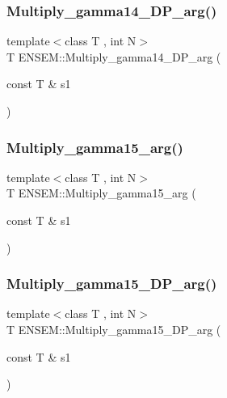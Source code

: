 \mbox{\label{namespaceENSEM_afea32aec2f20f6bef65800f628aa2ac6}} 
\subsubsection{\texorpdfstring{Multiply\_gamma14\_DP\_arg()}{Multiply\_gamma14\_DP\_arg()}}
{\footnotesize\ttfamily template$<$class T , int N$>$ \\
T E\+N\+S\+E\+M\+::\+Multiply\+\_\+gamma14\+\_\+\+D\+P\+\_\+arg (\begin{DoxyParamCaption}\item[{const T \&}]{s1 }\end{DoxyParamCaption})\hspace{0.3cm}{\ttfamily [inline]}}

\mbox{\label{namespaceENSEM_ad162069adba3b41fb86d8ff508380d57}} 
\subsubsection{\texorpdfstring{Multiply\_gamma15\_arg()}{Multiply\_gamma15\_arg()}}
{\footnotesize\ttfamily template$<$class T , int N$>$ \\
T E\+N\+S\+E\+M\+::\+Multiply\+\_\+gamma15\+\_\+arg (\begin{DoxyParamCaption}\item[{const T \&}]{s1 }\end{DoxyParamCaption})\hspace{0.3cm}{\ttfamily [inline]}}

\mbox{\label{namespaceENSEM_a2604fc2158319ad3521cb11baf9f4827}} 
\subsubsection{\texorpdfstring{Multiply\_gamma15\_DP\_arg()}{Multiply\_gamma15\_DP\_arg()}}
{\footnotesize\ttfamily template$<$class T , int N$>$ \\
T E\+N\+S\+E\+M\+::\+Multiply\+\_\+gamma15\+\_\+\+D\+P\+\_\+arg (\begin{DoxyParamCaption}\item[{const T \&}]{s1 }\end{DoxyParamCaption})\hspace{0.3cm}{\ttfamily [inline]}}

